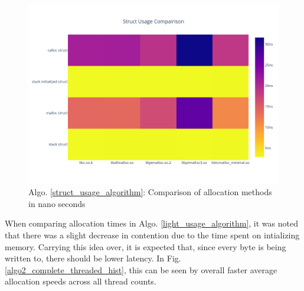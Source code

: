 \documentclass[letterpaper, 10 pt, conference]{ieeeconf}  %
\newcommand*\todo[0]{\textcolor{red}{TODO }}
\begin{document}
\begin{figure}[tbh!]
  \centering
  \includegraphics[width=\columnwidth]{graphs/struct_hist.png}
  \caption{ Algo. \ref{struct_usage_algorithm}: Comparison of allocation methods in nano seconds }
  \label{algo2_complete_hist}
\end{figure} 






When comparing allocation times in Algo. \ref{light_usage_algorithm}, it was noted that there was a slight decrease in contention due to the time spent on intializing memory.
Carrying this idea over, it is expected that, since every byte is being written to, there should be lower latency.
In Fig. \ref{algo2_complete_threaded_hist}, this can be seen by overall faster average allocation speeds across all thread counts.
\end{document}
